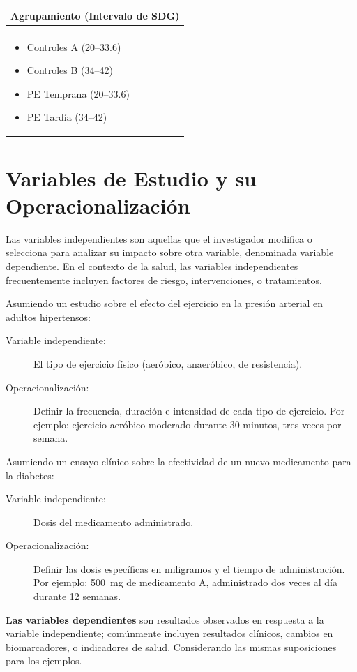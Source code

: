 \documentclass[12pt,letterpaper,spanish, twoside]{article}
\begin{document}
\begin{table}
\begin{tabular}{p{}}
   \textbf{Agrupamiento (Intervalo de SDG)}\\ \hline\\[-2em]
 	\begin{itemize}[itemsep=0.3em]
     \item Controles A (20--33.6)
     \item Controles B (34--42)
     \item PE Temprana (20--33.6)
     \item PE Tardía (34--42)
 	\end{itemize} \\[-1em]
   \hline     
 \end{tabular}
\end{table}

\section{Variables de Estudio y su Operacionalización}
Las variables independientes son aquellas que el investigador modifica o selecciona para analizar su impacto sobre otra variable, denominada variable dependiente. En el contexto de la salud, las variables independientes frecuentemente incluyen factores de riesgo, intervenciones, o tratamientos.

\ej Asumiendo un estudio sobre el efecto del ejercicio en la presión arterial en adultos hipertensos:
\begin{description}
 \item[Variable independiente:] El tipo de ejercicio físico (aeróbico, anaeróbico, de resistencia).
 \item[Operacionalización:] Definir la frecuencia, duración e intensidad de cada tipo de ejercicio. Por ejemplo: ejercicio aeróbico moderado durante 30 minutos, tres veces por semana.
\end{description}

\ej Asumiendo un ensayo clínico sobre la efectividad de un nuevo medicamento para la diabetes:
\begin{description}
 \item[Variable independiente:] Dosis del medicamento administrado.
 \item[Operacionalización:] Definir las dosis específicas en miligramos y el tiempo de administración. Por ejemplo: 500~mg de medicamento A, administrado dos veces al día durante 12 semanas.
\end{description}


\textbf{Las variables dependientes} son resultados observados en respuesta a la variable independiente; comúnmente incluyen resultados clínicos, cambios en biomarcadores, o indicadores de salud. Considerando las mismas suposiciones para los ejemplos.
\end{document}
